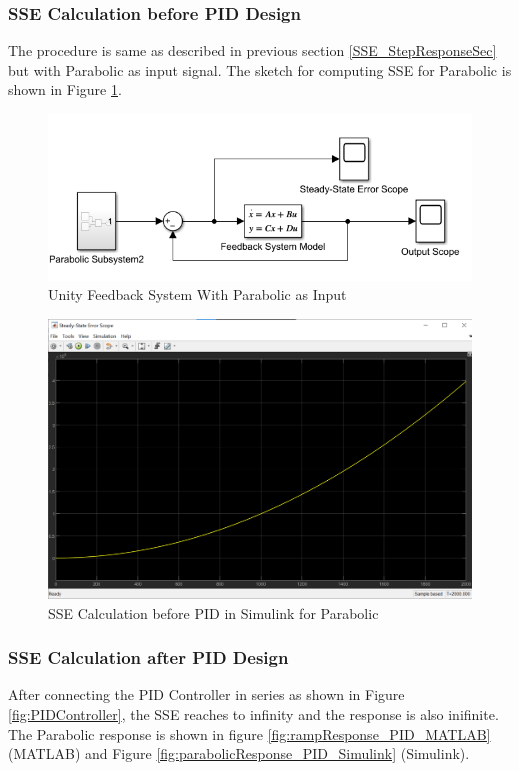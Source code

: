 \documentclass{article}
\begin{document}
\subsubsection{SSE Calculation before PID Design}
The procedure is same as described in previous section \ref{SSE_StepResponseSec} but with Parabolic as input signal. The sketch for computing SSE for Parabolic is shown in Figure \ref{fig:SSE_Sketch_Parabolic}.

\begin{figure}[h!]
	\centering
	\includegraphics[scale=0.75]{images/SSE_Sketch_Parabolic.png}
	\caption{Unity Feedback System With Parabolic as Input}
	\label{fig:SSE_Sketch_Parabolic}
\end{figure}

\begin{figure}[h!]
	\centering
	\includegraphics[scale=0.5]{images/SSE_BeforePID_Simulink_Parabolic.png}
	\caption{SSE Calculation before PID in Simulink for Parabolic}
	\label{fig:SSE_BeforePID_SimulinkParabolic}
\end{figure}


\subsubsection{SSE Calculation after PID Design}
After connecting the PID Controller in series as shown in Figure \ref{fig:PIDController}, the SSE reaches to infinity and the response is also inifinite. The Parabolic response is shown in figure \ref{fig:rampResponse_PID_MATLAB} (MATLAB) and Figure \ref{fig:parabolicResponse_PID_Simulink} (Simulink).
\end{document}
